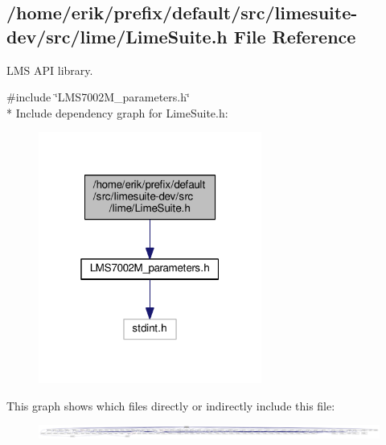 \subsection{/home/erik/prefix/default/src/limesuite-\/dev/src/lime/\+Lime\+Suite.h File Reference}
\label{LimeSuite_8h}


L\+MS A\+PI library.  


{\ttfamily \#include \char`\"{}L\+M\+S7002\+M\+\_\+parameters.\+h\char`\"{}}\\*
Include dependency graph for Lime\+Suite.\+h\+:
\nopagebreak
\begin{figure}[H]
\begin{center}
\leavevmode
\includegraphics[width=208pt]{d8/de2/LimeSuite_8h__incl}
\end{center}
\end{figure}
This graph shows which files directly or indirectly include this file\+:
\nopagebreak
\begin{figure}[H]
\begin{center}
\leavevmode
\includegraphics[width=350pt]{d8/ddc/LimeSuite_8h__dep__incl}
\end{center}
\end{figure}
